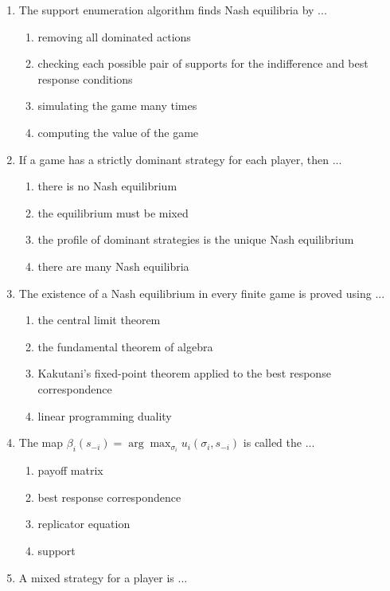 \documentclass[11pt]{article}
\begin{document}
\begin{enumerate}[itemsep=6pt]
\begin{enumerate}
    \item is always played in equilibrium
    \item must be strictly dominated too
  \end{enumerate}
  \item The support enumeration algorithm finds Nash equilibria by ...
  \begin{enumerate}
    \item removing all dominated actions
    \item checking each possible pair of supports for the indifference and best response conditions
    \item simulating the game many times
    \item computing the value of the game
  \end{enumerate}
  \item If a game has a strictly dominant strategy for each player, then ...
  \begin{enumerate}
    \item there is no Nash equilibrium
    \item the equilibrium must be mixed
    \item the profile of dominant strategies is the unique Nash equilibrium
    \item there are many Nash equilibria
  \end{enumerate}
  \item The existence of a Nash equilibrium in every finite game is proved using ...
  \begin{enumerate}
    \item the central limit theorem
    \item the fundamental theorem of algebra
    \item Kakutani's fixed-point theorem applied to the best response correspondence
    \item linear programming duality
  \end{enumerate}
  \item The map \(\beta_i(s_{-i}) = \arg\max_{\sigma_i} u_i(\sigma_i, s_{-i})\) is called the ...
  \begin{enumerate}
    \item payoff matrix
    \item best response correspondence
    \item replicator equation
    \item support
  \end{enumerate}
  \item A mixed strategy for a player is ...

\end{enumerate}
\end{document}
